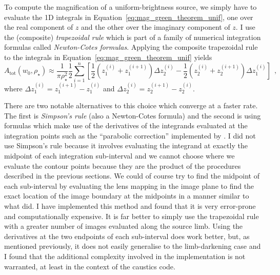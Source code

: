 \documentclass[12pt,dvipsnames]{report}
\newcommand{\ssf}[1]{\textsf{#1}}
\newcommand{\hquad}{~~}
\begin{document}
To compute the magnification of a uniform-brightness source, we simply have to evaluate the 1D 
integrals in Equation~\ref{eq:mag_green_theorem_unif}, one over the real component of $z$
and the other over the imaginary component of $z$. 
I use the (composite) \emph{trapezoidal rule} which is part of 
a family of numerical integration formulas called \emph{Newton-Cotes formulas}. 
Applying the composite trapezoidal rule to the integrals in Equation~\ref{eq:mag_green_theorem_unif}
yields
\begin{equation}
    A_\mathrm{tot}\left(w_0, \rho_{\star}\right)\approx  \frac{1}{ \pi \rho_{\star}^{2}}
    \frac{1}{2}\sum_{i=1}^{n}\left[\frac{1}{2}\left(z_1^{(i)}+z_1^{(i+1)}\right)\Delta z_2^{(i)}
    -\frac{1}{2}\left(z_2^{(i)}+z_2^{(i+1)}\right)\Delta z_1^{(i)}\right]
    \hquad,
\label{eq:mag_trapezoidal}
\end{equation}
where $\Delta z_1^{(i)}= z_1^{(i+1)}-z_1^{(i)}$ and $\Delta z_2^{(i)}= z_2^{(i+1)}-z_2^{(i)}$.


There are two notable alternatives to this choice which converge at a faster rate. 
The first is \emph{Simpson's rule}
(also a Newton-Cotes formula) and the second is using formulas which make use of the derivatives 
of the integrands evaluated at the integration points such as the ``parabolic correction''
implemented by \citet{2010MNRAS.408.2188B}. I did not use Simpson's rule because it involves 
evaluating the integrand at exactly the midpoint of each integration sub-interval and we cannot 
choose where we evaluate the contour points because they are the product of the procedures 
described in the previous sections. We could of course try to find the midpoint of each 
sub-interval by evaluating the lens mapping in the image plane to find the exact location of the 
image boundary at the midpoints in a manner similar to what \citet{2010ApJ...716.1408B} did. 
I have implemented this method and found that it is very error-prone and computationally expensive. It 
is far better to simply use the trapezoidal rule with a greater number of images evaluated 
along the source limb.  Using the derivatives at the two endpoints of each sub-interval 
does work better, but, as mentioned previously, it does not easily generalise to the 
limb-darkening case and I found that the additional complexity involved in the implementation 
is not warranted, at least in the context of the \ssf{caustics} code.
\end{document}
